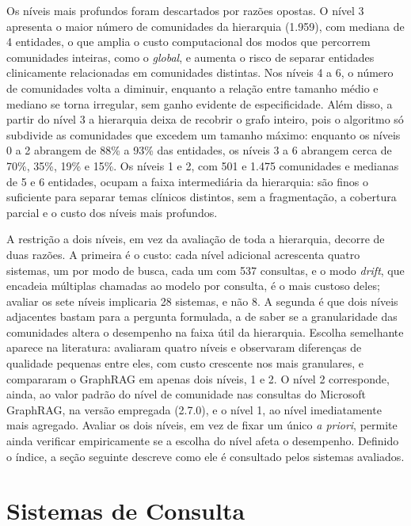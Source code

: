 Os níveis mais profundos foram descartados por razões opostas. O nível 3 apresenta o maior número de comunidades da hierarquia (1.959), com mediana de 4 entidades, o que amplia o custo computacional dos modos que percorrem comunidades inteiras, como o \textit{global}, e aumenta o risco de separar entidades clinicamente relacionadas em comunidades distintas. Nos níveis 4 a 6, o número de comunidades volta a diminuir, enquanto a relação entre tamanho médio e mediano se torna irregular, sem ganho evidente de especificidade. Além disso, a partir do nível 3 a hierarquia deixa de recobrir o grafo inteiro, pois o algoritmo só subdivide as comunidades que excedem um tamanho máximo: enquanto os níveis 0 a 2 abrangem de 88\% a 93\% das entidades, os níveis 3 a 6 abrangem cerca de 70\%, 35\%, 19\% e 15\%. Os níveis 1 e 2, com 501 e 1.475 comunidades e medianas de 5 e 6 entidades, ocupam a faixa intermediária da hierarquia: são finos o suficiente para separar temas clínicos distintos, sem a fragmentação, a cobertura parcial e o custo dos níveis mais profundos.

A restrição a dois níveis, em vez da avaliação de toda a hierarquia, decorre de duas razões. A primeira é o custo: cada nível adicional acrescenta quatro sistemas, um por modo de busca, cada um com 537 consultas, e o modo \textit{drift}, que encadeia múltiplas chamadas ao modelo por consulta, é o mais custoso deles; avaliar os sete níveis implicaria 28 sistemas, e não 8. A segunda é que dois níveis adjacentes bastam para a pergunta formulada, a de saber se a granularidade das comunidades altera o desempenho na faixa útil da hierarquia. Escolha semelhante aparece na literatura: \citet{edge2024} avaliaram quatro níveis e observaram diferenças de qualidade pequenas entre eles, com custo crescente nos mais granulares, e \citet{wang2026archrag} compararam o GraphRAG em apenas dois níveis, 1 e 2. O nível 2 corresponde, ainda, ao valor padrão do nível de comunidade nas consultas do Microsoft GraphRAG, na versão empregada (2.7.0), e o nível 1, ao nível imediatamente mais agregado. Avaliar os dois níveis, em vez de fixar um único \textit{a priori}, permite ainda verificar empiricamente se a escolha do nível afeta o desempenho. Definido o índice, a seção seguinte descreve como ele é consultado pelos sistemas avaliados.

\section{Sistemas de Consulta}\label{sec:met-sistemas}

